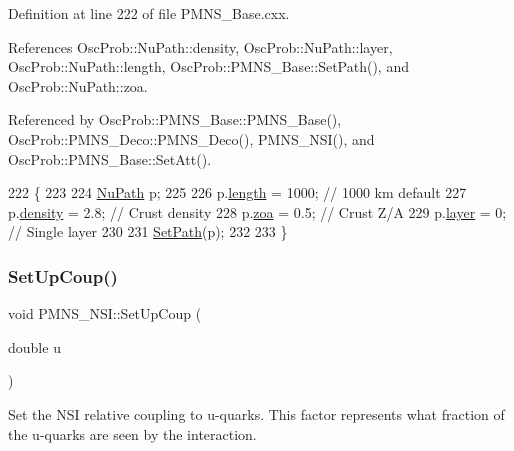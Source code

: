 Definition at line 222 of file P\+M\+N\+S\+\_\+\+Base.\+cxx.



References Osc\+Prob\+::\+Nu\+Path\+::density, Osc\+Prob\+::\+Nu\+Path\+::layer, Osc\+Prob\+::\+Nu\+Path\+::length, Osc\+Prob\+::\+P\+M\+N\+S\+\_\+\+Base\+::\+Set\+Path(), and Osc\+Prob\+::\+Nu\+Path\+::zoa.



Referenced by Osc\+Prob\+::\+P\+M\+N\+S\+\_\+\+Base\+::\+P\+M\+N\+S\+\_\+\+Base(), Osc\+Prob\+::\+P\+M\+N\+S\+\_\+\+Deco\+::\+P\+M\+N\+S\+\_\+\+Deco(), P\+M\+N\+S\+\_\+\+N\+S\+I(), and Osc\+Prob\+::\+P\+M\+N\+S\+\_\+\+Base\+::\+Set\+Att().


\begin{DoxyCode}
222                           \{
223 
224   \hyperlink{structOscProb_1_1NuPath}{NuPath} p;
225 
226   p.\hyperlink{structOscProb_1_1NuPath_af22660894b6e25cf835500381b155557}{length}  = 1000; \textcolor{comment}{// 1000 km default}
227   p.\hyperlink{structOscProb_1_1NuPath_a54ddd451db69bc54434de3cf18a117ca}{density} = 2.8;  \textcolor{comment}{// Crust density}
228   p.\hyperlink{structOscProb_1_1NuPath_af3213f3691ba83c6bc05f4a3490f6b31}{zoa}     = 0.5;  \textcolor{comment}{// Crust Z/A}
229   p.\hyperlink{structOscProb_1_1NuPath_a442b160899e554ad1d800989510d5309}{layer}   = 0;    \textcolor{comment}{// Single layer}
230 
231   \hyperlink{classOscProb_1_1PMNS__Base_ac3b644fd0a56347d304ceca4ae9d8875}{SetPath}(p);
232 
233 \}
\end{DoxyCode}
\mbox{\label{classOscProb_1_1PMNS__NSI_a27ecfa2a97c67e6bfb399eeba956f74f}} 
\subsubsection{\texorpdfstring{Set\+Up\+Coup()}{SetUpCoup()}}
{\footnotesize\ttfamily void P\+M\+N\+S\+\_\+\+N\+S\+I\+::\+Set\+Up\+Coup (\begin{DoxyParamCaption}\item[{double}]{u }\end{DoxyParamCaption})\hspace{0.3cm}{\ttfamily [virtual]}}

Set the N\+SI relative coupling to u-\/quarks. This factor represents what fraction of the u-\/quarks are seen by the interaction.


